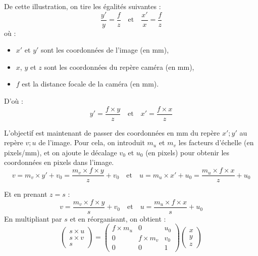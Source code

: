 \documentclass[12pt]{article}
\begin{document}

De cette illustration, on tire les égalités suivantes :
\begin{equation}
    \frac{y'}{y} = \frac{f}{z}
    \quad \text{et} \quad \frac{x'}{x} = \frac{f}{z}
\end{equation}
où :
\begin{itemize}
    \item $x'$ et $y'$ sont les coordonnées de l'image (en mm),
    \item $x$, $y$ et $z$ sont les coordonnées du repère caméra (en mm),
    \item $f$ est la distance focale de la caméra  (en mm).
\end{itemize}
\vspace{1cm}

D'où :
\begin{equation}
    y' = \frac{f \times y}{z}
    \quad \text{et} \quad x' = \frac{f \times x}{z}
\end{equation}

L'objectif est maintenant de passer des coordonnées en mm du repère $x';y'$ au repère $v;u$ de l'image.
Pour cela, on introduit $m_u$ et $m_v$ les facteurs d'échelle (en pixels/mm), et on ajoute le décalage $v_{0}$ et $u_{0}$ (en pixels) pour obtenir les coordonnées en pixels dans l'image.
\begin{equation}
    v = m_v \times y' + v_{0} = \frac{m_v \times f \times y}{z} + v_{0}
    \quad \text{et} \quad u = m_u \times x' + u_{0} = \frac{m_u \times f \times x}{z} + u_{0}
\end{equation}

Et en prenant $z = s$ :
\begin{equation}
    v = \frac{m_v \times f \times y}{s} + v_{0}
    \quad \text{et} \quad u = \frac{m_u \times f \times x}{s} + u_{0}
\end{equation}
En multipliant par $s$ et en réorganisant, on obtient :
\begin{equation}
    \begin{pmatrix}
    s \times u \\
    s \times v \\
    s
    \end{pmatrix} = 
    \begin{pmatrix}
    f \times m_{u} & 0 & u_{0} \\
    0 & f \times m_{v} & v_{0} \\
    0 & 0 & 1
    \end{pmatrix}
    \begin{pmatrix}
    x \\
    y \\
    z
    \end{pmatrix}
\end{equation}
\end{document}
